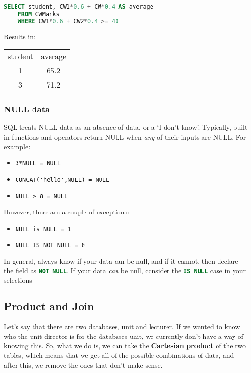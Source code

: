 \documentclass[11pt,a4paper,titlepage,dvipsnames,cmyk]{scrartcl}
\begin{document}
\begin{lstlisting}[language=SQL]
SELECT student, CW1*0.6 + CW*0.4 AS average
    FROM CWMarks
    WHERE CW1*0.6 + CW2*0.4 >= 40
\end{lstlisting}

Results in:

\begin{center}
    \begin{tabular}{c|c}
        student & average \\ \hhline{=|=}
        1 & 65.2 \\
        3 & 71.2
    \end{tabular}
\end{center}

\subsubsection{NULL data}%
\label{ssub:NULL}

SQL treats NULL data as an absence of data, or a `I don't know'.
Typically, built in functions and operators return NULL when \textit{any}
of their inputs are NULL. For example:

\begin{itemize}
    \item \lstinline{3*NULL = NULL}
    \item \lstinline{CONCAT('hello',NULL) = NULL} 
    \item \lstinline{NULL > 8 = NULL} 
\end{itemize}

However, there are a couple of exceptions:

\begin{itemize}
    \item \lstinline{NULL is NULL = 1}
        \item \lstinline{NULL IS NOT NULL = 0} 
\end{itemize}

In general, always know if your data can be null, and if it cannot, then
declare the field as \lstinline[language=SQL]{NOT NULL}. If your data
\textit{can} be null, consider the \lstinline[language=SQL]{IS NULL} case
in your selections.

\subsection{Product and Join}%
\label{sub:product-join}

Let's say that there are two databases, unit and lecturer. If we wanted to
know who the unit director is for the databases unit, we currently don't
have a way of knowing this. So, what we do is, we can take the
\textbf{Cartesian product} of the two tables, which means that we get all
of the possible combinations of data, and after this, we remove the ones
that don't make sense.
\end{document}
